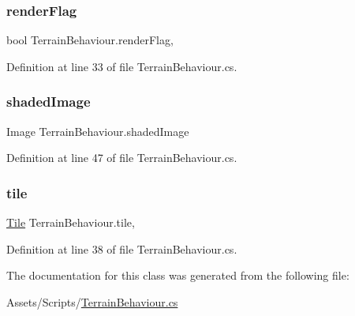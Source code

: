 \subsubsection{\texorpdfstring{renderFlag}{renderFlag}}
{\footnotesize\ttfamily bool Terrain\+Behaviour.\+render\+Flag\hspace{0.3cm}{\ttfamily [get]}, {\ttfamily [set]}}



Definition at line 33 of file Terrain\+Behaviour.\+cs.

\mbox{\label{class_terrain_behaviour_a91996bf69ee24b36099fa7a6b54aeaa5}} 
\subsubsection{\texorpdfstring{shadedImage}{shadedImage}}
{\footnotesize\ttfamily Image Terrain\+Behaviour.\+shaded\+Image\hspace{0.3cm}{\ttfamily [get]}}



Definition at line 47 of file Terrain\+Behaviour.\+cs.

\mbox{\label{class_terrain_behaviour_a1c30fc3fee30bea9e90ee4acabcb5819}} 
\subsubsection{\texorpdfstring{tile}{tile}}
{\footnotesize\ttfamily \mbox{\hyperlink{class_tile}{Tile}} Terrain\+Behaviour.\+tile\hspace{0.3cm}{\ttfamily [get]}, {\ttfamily [set]}}



Definition at line 38 of file Terrain\+Behaviour.\+cs.



The documentation for this class was generated from the following file\+:\begin{DoxyCompactItemize}
\item 
Assets/\+Scripts/\mbox{\hyperlink{_terrain_behaviour_8cs}{Terrain\+Behaviour.\+cs}}\end{DoxyCompactItemize}
